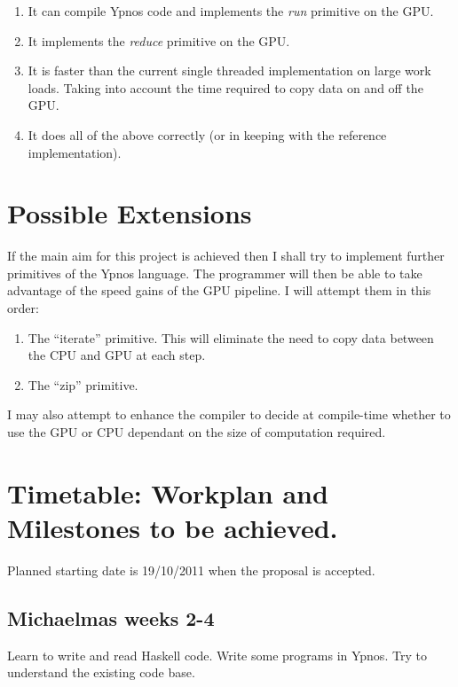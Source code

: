 \begin{enumerate}

\item It can compile Ypnos code and implements the \emph{run} primitive on the 
GPU.

\item It implements the \emph{reduce} primitive on the GPU.

\item It is faster than the current single threaded implementation on large 
work loads. Taking into account the time required to copy data on and off the 
GPU.

\item It does all of the above correctly (or in keeping with the reference 
implementation).

\end{enumerate}

\section*{Possible Extensions}

If the main aim for this project is achieved then I shall try to implement 
further primitives of the Ypnos language. The programmer will then be able to 
take advantage of the speed gains of the GPU pipeline. I will attempt them in 
this order:

\begin{enumerate}

\item The ``iterate'' primitive. This will eliminate the need to copy data 
between the CPU and GPU at each step.

\item The ``zip'' primitive.

\end{enumerate}

I may also attempt to enhance the compiler to decide at compile-time whether to 
use the GPU or CPU dependant on the size of computation required.

\section*{Timetable: Workplan and Milestones to be achieved.}

Planned starting date is 19/10/2011 when the proposal is accepted.

\subsection*{Michaelmas weeks 2-4} Learn to write and read Haskell code. Write 
some programs in Ypnos. Try to understand the existing code base. 

